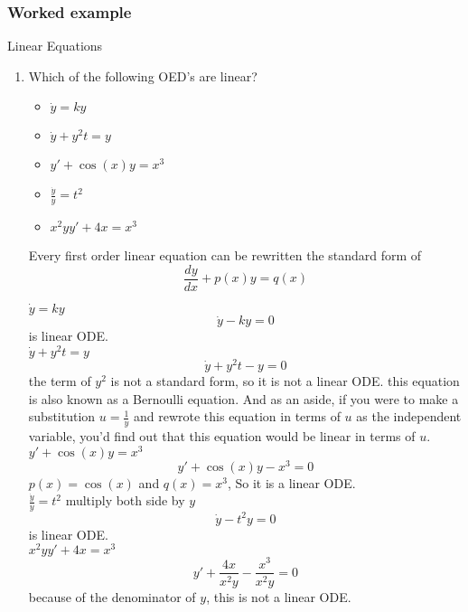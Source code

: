 \subsubsection{Worked example}
Linear Equations
\begin{enumerate}
\item Which of the following OED's are linear?
  \begin{itemize}
  \item $\dot{y} = ky$
  \item $\dot{y} + y^2 t = y$
  \item $y' + \cos (x) y = x^3$
  \item $\frac{\dot{y}}{y} = t^2$
  \item $x^2yy' + 4x = x^3$
  \end{itemize}
  Every first order linear equation can be rewritten the standard form of
  \begin{equation*}
    \frac{dy}{dx} + p(x)y = q(x)
  \end{equation*}
  
  $\dot{y} = ky$ 
  \begin{equation*}
    \dot{y} - ky = 0 
  \end{equation*}
  is linear ODE.\\

  $\dot{y} + y^2 t = y$
  \begin{equation*}
    \dot{y} + y^2 t -y = 0 
  \end{equation*}
  the term of $y^2$ is not a standard form, so it is not a linear ODE.
  this equation is also known as a Bernoulli equation.
  And as an aside, if you were to make a substitution $u = \frac{1}{y}$ and rewrote
  this equation in terms of $u$ as the independent variable,
  you'd find out that this equation would be linear in terms of $u$.\\

  $y' + \cos (x) y = x^3$
  \begin{equation*}
    y' + \cos (x) y - x^3 = 0 
  \end{equation*}
  $p(x) = \cos (x)$ and $q(x) = x^3$, So it is a linear ODE.\\

  $\frac{\dot{y}}{y} = t^2$ multiply both side by $y$
  \begin{equation*}
    \dot{y} - t^2 y = 0 
  \end{equation*}
  is linear ODE. \\

  $x^2yy' + 4x = x^3$
  \begin{equation*}
    y' + \frac{4x}{x^2 y} - \frac{x^3}{x^2 y} = 0
  \end{equation*}
  because of the denominator of $y$, this is not a linear ODE.   
  

\end{enumerate}
